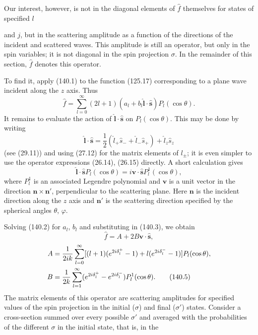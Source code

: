 Our interest, however, is not in the diagonal elements of $\hat f$ themselves
for states of specified $l$

and $j$, but in the scattering amplitude as a function of the directions of
the incident and scattered waves. This amplitude is still an operator, but
only in the spin variables; it is not diagonal in the spin projection
$\sigma$. In the remainder of this section, $\hat f$ denotes this operator.

To find it, apply (140.1) to the function (125.17) corresponding to a plane
wave incident along the $z$ axis. Thus
\begin{equation}
 \hat f=\sum_{l=0}^{\infty}(2l+1)(a_l+b_l\hat{\mathbf l}\cdot\hat{\mathbf s})P_l(\cos\theta).
 \tag{140.3}
\end{equation}
It remains to evaluate the action of
$\hat{\mathbf l}\cdot\hat{\mathbf s}$ on $P_l(\cos\theta)$. This may be done
by writing
\[
 \hat{\mathbf l}\cdot\hat{\mathbf s}
 =\frac12(\hat l_+\hat s_-+\hat l_-\hat s_+)+\hat l_z\hat s_z
\]
(see (29.11)) and using (27.12) for the matrix elements of $l_\pm$; it is even
simpler to use the operator expressions (26.14), (26.15) directly. A short
calculation gives
\[
 \hat{\mathbf l}\cdot\hat{\mathbf s}P_l(\cos\theta)
 =i\mathbf v\cdot\hat{\mathbf s}P_l^1(\cos\theta),
\]
where $P_l^1$ is an associated Legendre polynomial and $\mathbf v$ is a unit
vector in the direction $\mathbf n\times\mathbf n'$, perpendicular to the
scattering plane. Here $\mathbf n$ is the incident direction along the $z$
axis and $\mathbf n'$ is the scattering direction specified by the spherical
angles $\theta$, $\varphi$.

Solving (140.2) for $a_l$, $b_l$ and substituting in (140.3), we obtain
\begin{equation}
 \hat f=A+2B\mathbf v\cdot\hat{\mathbf s},
 \tag{140.4}
\end{equation}
\begin{align}
 A&=\frac1{2ik}\sum_{l=0}^{\infty}[(l+1)(e^{2i\delta_l^+}-1)+l(e^{2i\delta_l^-}-1)]P_l(\cos\theta),\notag\\
 B&=\frac1{2k}\sum_{l=1}^{\infty}(e^{2i\delta_l^+}-e^{2i\delta_l^-})P_l^1(\cos\theta).
 \tag{140.5}
\end{align}
The matrix elements of this operator are scattering amplitudes for specified
values of the spin projection in the initial ($\sigma$) and final
($\sigma'$) states. Consider a cross-section summed over every possible
$\sigma'$ and averaged with the probabilities of the different $\sigma$ in
the initial state, that is, in the

